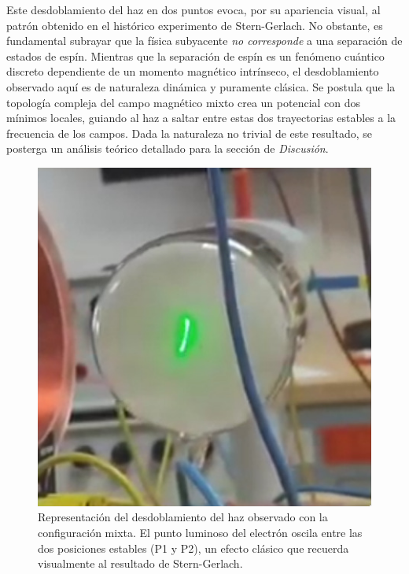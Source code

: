 Este desdoblamiento del haz en dos puntos evoca, por su apariencia visual,
al patrón obtenido en el histórico experimento de Stern-Gerlach. No
obstante, es fundamental subrayar que la física subyacente \emph{no
corresponde} a una separación de estados de espín. Mientras que la
separación de espín es un fenómeno cuántico discreto dependiente de un
momento magnético intrínseco, el desdoblamiento observado aquí es de
naturaleza dinámica y puramente clásica. Se postula que la topología
compleja del campo magnético mixto crea un potencial con dos mínimos
locales, guiando al haz a saltar entre estas dos trayectorias estables a la
frecuencia de los campos. Dada la naturaleza no trivial de este resultado,
se posterga un análisis teórico detallado para la sección de \emph{Discusión}.

\begin{figure}[htbp!]
	\centering
	\includegraphics[width=0.7\linewidth]{../Figures/points.jpeg}
	\caption{Representación del desdoblamiento del haz observado con la
		configuración mixta. El punto luminoso del electrón oscila entre las
		dos posiciones estables (P1 y P2), un efecto clásico que recuerda
	visualmente al resultado de Stern-Gerlach.}
	\label{fig:resultados_desdoblamiento}
\end{figure}
